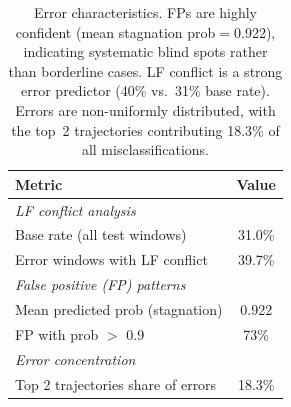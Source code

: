 \begin{table}[h]
\centering
\small
\begin{tabular}{lc}
\toprule
\textbf{Metric} & \textbf{Value} \\
\midrule
\multicolumn{2}{l}{\emph{LF conflict analysis}} \\
\quad Base rate (all test windows) & 31.0\% \\
\quad Error windows with LF conflict & 39.7\% \\
\midrule
\multicolumn{2}{l}{\emph{False positive (FP) patterns}} \\
\quad Mean predicted prob (stagnation) & 0.922 \\
\quad FP with prob $>$ 0.9 & 73\% \\
\midrule
\multicolumn{2}{l}{\emph{Error concentration}} \\
\quad Top 2 trajectories share of errors & 18.3\% \\
\bottomrule
\end{tabular}
\caption{Error characteristics. FPs are highly confident (mean stagnation prob$=$0.922), indicating systematic blind spots rather than borderline cases. LF conflict is a strong error predictor (40\% vs.\ 31\% base rate). Errors are non-uniformly distributed, with the top~2 trajectories contributing 18.3\% of all misclassifications.}
\label{tab:error_patterns}
\end{table}
